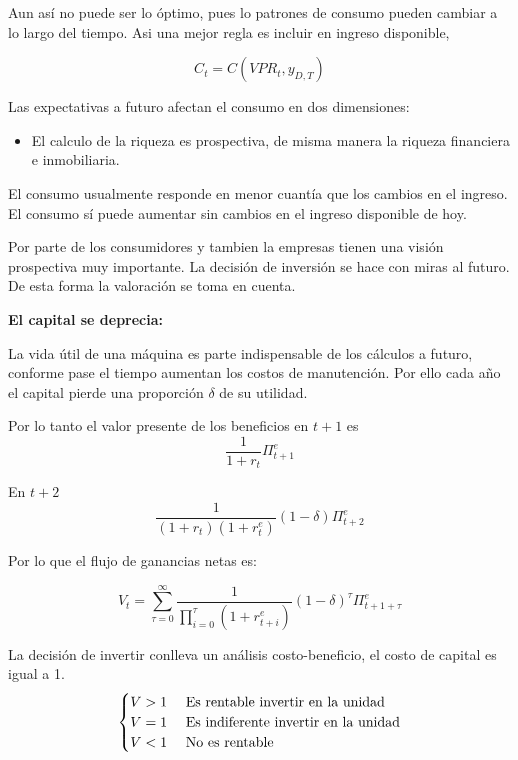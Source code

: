 Aun así no puede ser lo óptimo, pues lo patrones de consumo pueden cambiar a lo largo del tiempo. Asi una mejor regla es incluir en ingreso disponible, 

\begin{equation}
    C_{t} = C(VPR_{t}, y_{D,T})
\end{equation}

Las expectativas a futuro afectan el consumo en dos dimensiones:
\begin{itemize}
    \item El calculo de la riqueza es prospectiva, de misma manera la riqueza financiera e inmobiliaria.
\end{itemize}

El consumo usualmente responde en menor cuantía que los cambios en el ingreso. El consumo sí puede aumentar sin cambios en el ingreso disponible de hoy. 

Por parte de los consumidores y  tambien la empresas tienen una visión prospectiva muy importante. La decisión de inversión se hace con miras al futuro. De esta forma la valoración se toma en cuenta. 

\textbf{El capital se deprecia:}

La vida útil de una máquina es parte indispensable de los cálculos a futuro, conforme pase el tiempo aumentan los costos de manutención. Por ello cada año el capital pierde una proporción $\delta$ de su utilidad. 

Por lo tanto el valor presente de los beneficios en $t+1$ es 
\begin{equation}
    \frac{1}{1+r_{t}} \Pi^{e}_{t+1}
\end{equation}

En $t+2$
\begin{equation}
    \frac{1}{(1+r_{t})(1+r^{e}_{t})}(1-\delta) \Pi^{e}_{t+2}
\end{equation}


Por lo que el flujo de ganancias netas es:

\begin{equation}
    V_{t}= \sum^{\infty}_{\tau = 0}\frac{1}{\prod^{\tau}_{i=0}(1+r^{e}_{t+i})}(1-\delta)^{\tau}\Pi^{e}_{t+1+\tau}
\end{equation}

La decisión de invertir conlleva un análisis costo-beneficio, el costo de capital es igual a 1. 
\begin{equation}
    \begin{cases}
    V>1 & \textup{ Es rentable invertir en la unidad} \\
    V=1 & \textup{ Es indiferente invertir en la unidad} \\
    V<1 & \textup{ No es rentable} \\
    \end{cases}
\end{equation}

